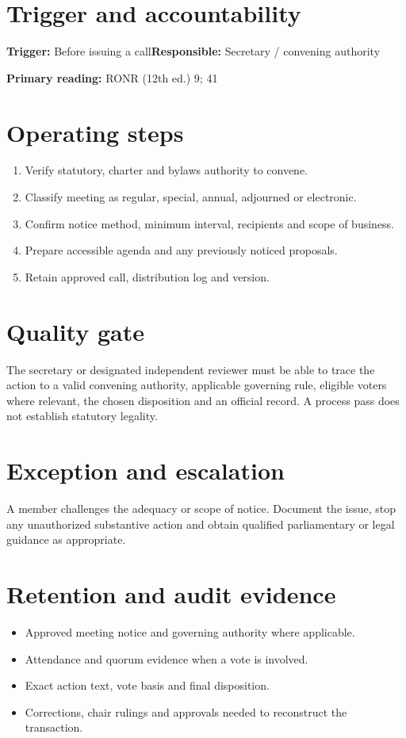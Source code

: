 \documentclass[11pt]{article}
\begin{document}
\SuiteOpen
{}
\section{Trigger and accountability}
\textbf{Trigger:} Before issuing a call\quad\textbf{Responsible:} Secretary / convening authority

\textbf{Primary reading:} RONR (12th ed.) 9; 41

\section{Operating steps}
\begin{enumerate}[leftmargin=*,itemsep=4pt]
\item Verify statutory, charter and bylaws authority to convene.
\item Classify meeting as regular, special, annual, adjourned or electronic.
\item Confirm notice method, minimum interval, recipients and scope of business.
\item Prepare accessible agenda and any previously noticed proposals.
\item Retain approved call, distribution log and version.
\end{enumerate}

\section{Quality gate}
The secretary or designated independent reviewer must be able to trace the action to a valid convening authority, applicable governing rule, eligible voters where relevant, the chosen disposition and an official record. A process pass does not establish statutory legality.

\section{Exception and escalation}
A member challenges the adequacy or scope of notice. Document the issue, stop any unauthorized substantive action and obtain qualified parliamentary or legal guidance as appropriate.

\section{Retention and audit evidence}
\begin{itemize}[leftmargin=*,itemsep=4pt]
\item Approved meeting notice and governing authority where applicable.
\item Attendance and quorum evidence when a vote is involved.
\item Exact action text, vote basis and final disposition.
\item Corrections, chair rulings and approvals needed to reconstruct the transaction.
\end{itemize}
\end{document}
